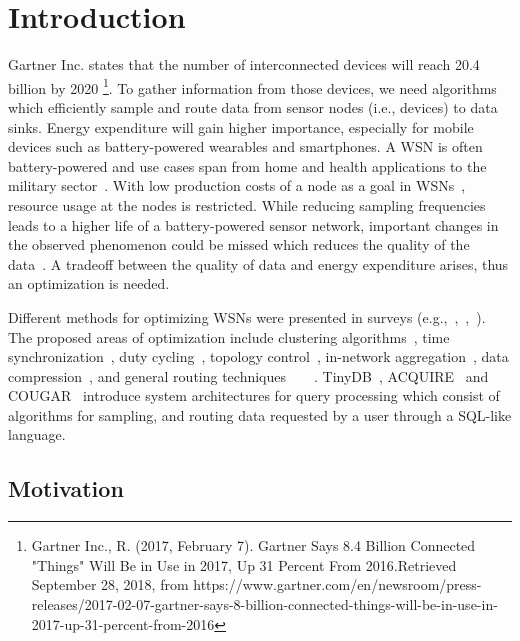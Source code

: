 \section{Introduction}
\label{sec:Introduction}
Gartner Inc. states that the number of interconnected devices will reach 20.4
billion by 2020 \footnote{Gartner Inc., R. (2017, February 7). Gartner Says 8.4
Billion Connected "Things" Will Be in Use in 2017, Up 31 Percent From
2016.Retrieved September 28, 2018, from
https://www.gartner.com/en/newsroom/press-releases/2017-02-07-gartner-says-8-billion-connected-things-will-be-in-use-in-2017-up-31-percent-from-2016}.
To gather information from those devices, we need algorithms which efficiently
sample and route data from sensor nodes (i.e., devices) to data sinks. Energy
expenditure will gain higher importance, especially for mobile devices such as
battery-powered wearables and smartphones. A \ac{WSN} is often battery-powered
and use cases span from home and health applications to the military
sector~\cite{akyildiz2002wireless}. With low production costs of a node as a
goal in \acp{WSN}~\cite{akyildiz2002wireless}, resource usage at the nodes is
restricted. While reducing sampling frequencies leads to a higher life of a
battery-powered sensor network, important changes in the observed phenomenon
could be missed which reduces the quality of the
data~\cite{akyildiz2002wireless}. A tradeoff between the quality of data and
energy expenditure arises, thus an optimization is needed. 
\par
Different methods for optimizing \acp{WSN} were presented in surveys
(e.g.,~\cite{abbasi2007survey},~\cite{sivrikaya2004time},~\cite{carrano2014survey}).
The proposed areas of optimization include clustering
algorithms~\cite{abbasi2007survey}, time
synchronization~\cite{sivrikaya2004time}, duty
cycling~\cite{carrano2014survey}, topology control~\cite{li2013survey},
in-network aggregation~\cite{fasolo2007network}, data
compression~\cite{srisooksai2012practical}, and general routing
techniques~\cite{al2004routing}~\cite{kulkarni2011particle}~\cite{singh2015survey}~\cite{rault2014energy}.
TinyDB~\cite{madden2005tinydb}, ACQUIRE~\cite{sadagopan2003acquire} and
COUGAR~\cite{yao2002cougar} introduce system architectures for query processing
which consist of algorithms for sampling, and routing data requested by a user
through a SQL-like language.


\subsection{Motivation}
\label{sec:motivation}

